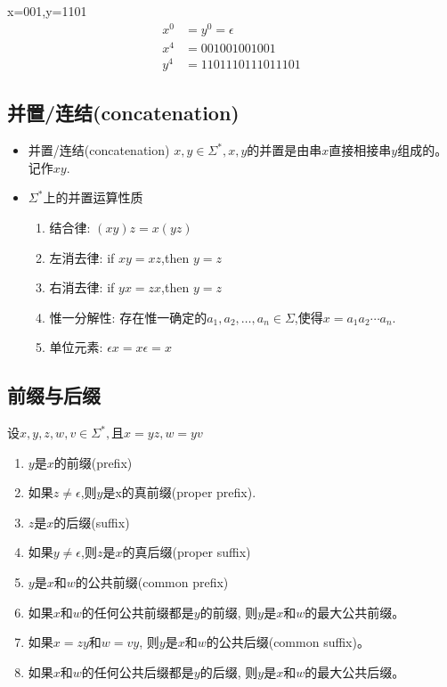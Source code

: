 \begin{example}
	x=001,y=1101
	\begin{align*}
	x^0 &= y^0 = \epsilon \\
	x^4 &= 001001001001 \\
	y^4 &= 1101110111011101
	\end{align*}
\end{example}

\subsection{并置/连结(concatenation)}
\begin{itemize}
	\item 并置/连结(concatenation)
	\subitem{-} $x,y\in \Sigma^{\ast},x,y$的并置是由串$x$直接相接串$y$组成的。记作$xy$.
	\item $\Sigma^{\ast}$上的并置运算性质
	\begin{enumerate}
		\item 结合律: $(xy)z=x(yz)$
		\item 左消去律: if $xy=xz$,then $y=z$
		\item 右消去律: if $yx=zx$,then $y=z$
		\item 惟一分解性: 存在惟一确定的$a_1,a_2,\dots,a_n \in \Sigma$,使得$x=a_1a_2\cdots a_n$.
		\item 单位元素: $\epsilon x=x\epsilon=x$
	\end{enumerate} 
\end{itemize}

\subsection{前缀与后缀}
设$x,y,z,w,v\in \Sigma^{\ast},$且$x=yz,w=yv$
\begin{enumerate}
	\item $y$是$x$的前缀(prefix)
	\item 如果$z\ne \epsilon$,则$y$是x的真前缀(proper prefix).
	\item $z$是$x$的后缀(suffix)
	\item 如果$y\ne \epsilon$,则$z$是$x$的真后缀(proper suffix)
	\item $y$是$x$和$w$的公共前缀(common prefix)
	\item 如果$x$和$w$的任何公共前缀都是$y$的前缀, 则$y$是$x$和$w$的最大公共前缀。
	\item 如果$x=zy$和$w=vy$, 则$y$是$x$和$w$的公共后缀(common suffix)。
	\item 如果$x$和$w$的任何公共后缀都是$y$的后缀, 则$y$是$x$和$w$的最大公共后缀。
\end{enumerate}

